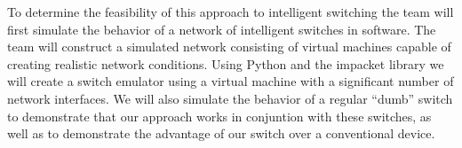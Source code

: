 \documentclass{article}
\begin{document}
	To determine the feasibility of this approach to intelligent switching the team will first simulate the behavior of a network of intelligent switches in software.
	The team will construct a simulated network consisting of virtual machines capable of creating realistic network conditions.
	Using Python and the impacket library we will create a switch emulator using a virtual machine with a significant number of network interfaces.
	We will also simulate the behavior of a regular ``dumb'' switch to demonstrate that our approach works in conjuntion with these switches, as well as to demonstrate the advantage of our switch over a conventional device.
\end{document}
